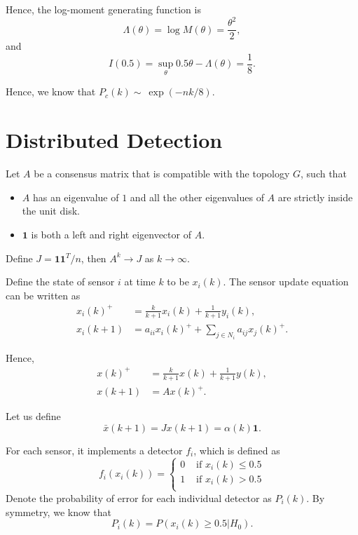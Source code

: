\documentclass{article}
\begin{document}
Hence, the log-moment generating function is 
\begin{displaymath}
  \Lambda(\theta) = \log M(\theta) = \frac{\theta^2}{2},
\end{displaymath}
and
\begin{displaymath}
  I(0.5) = \sup_{\theta} 0.5\theta - \Lambda(\theta) = \frac{1}{8}. 
\end{displaymath}

Hence, we know that $P_c(k)\sim~\exp(-nk/8)$.

\section{Distributed Detection}
Let $A$ be a consensus matrix that is compatible with the topology $G$, such that
\begin{itemize}
  \item $A$ has an eigenvalue of $1$ and all the other eigenvalues of $A$ are strictly inside the unit disk.
  \item $\mathbf 1$ is both a left and right eigenvector of $A$.
\end{itemize}

Define $J = \mathbf 1\mathbf 1^T/n$, then $A^k\rightarrow J$ as $k\rightarrow \infty$. 

Define the state of sensor $i$ at time $k$ to be $x_i(k)$. The sensor update equation can be written as
\begin{align*}
  x_i(k)^+  &= \frac{k}{k+1}x_i(k) + \frac{1}{k+1}y_i(k),\\
  x_i(k+1) &= a_{ii}x_i(k)^+ + \sum_{j\in N_i}a_{ij}x_j(k)^+.
\end{align*}

Hence,
\begin{align*}
  x(k)^+  &= \frac{k}{k+1}x(k) + \frac{1}{k+1}y(k),\\
  x(k+1) &= Ax(k)^+.
\end{align*}

Let us define 
\begin{displaymath}
 \bar x(k+1) = Jx(k+1) = \alpha(k) \mathbf 1.
\end{displaymath}

For each sensor, it implements a detector $f_i$, which is defined as
\begin{displaymath}
  f_i(x_i(k)) =\begin{cases}
    0&\text{ if }x_i(k)\leq 0.5\\
    1&\text{ if }x_i(k)> 0.5\\
  \end{cases}
\end{displaymath}
Denote the probability of error for each individual detector as $P_i(k)$. By symmetry, we know that
\begin{displaymath}
 P_i(k) = P(x_i(k) \geq 0.5|H_0).
\end{displaymath}
\end{document}
